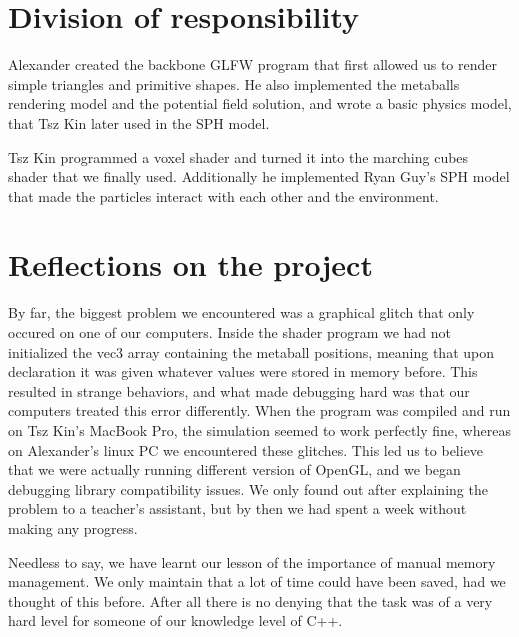 \documentclass{article}
\begin{document}
\begin{multicols}{2}
    \section{Division of responsibility}

    Alexander created the backbone GLFW program that first allowed us to render simple triangles and primitive shapes. He also implemented the metaballs rendering model and the potential field solution, and wrote a basic physics model, that Tsz Kin later used in the SPH model.

    Tsz Kin programmed a voxel shader and turned it into the marching cubes shader that we finally used. Additionally he implemented Ryan Guy's SPH model that made the particles interact with each other and the environment.

    \section{Reflections on the project}

    By far, the biggest problem we encountered was a graphical glitch that only occured on one of our computers. Inside the shader program we had not initialized the vec3 array containing the metaball positions, meaning that upon declaration it was given whatever values were stored in memory before. This resulted in strange behaviors, and what made debugging hard was that our computers treated this error differently.
    When the program was compiled and run on Tsz Kin's MacBook Pro, the simulation seemed to work perfectly fine, whereas on Alexander's linux PC we encountered these glitches. This led us to believe that we were actually running different version of OpenGL, and we began debugging library compatibility issues. We only found out after explaining the problem to a teacher's assistant, but by then we had spent a week without making any progress.

    Needless to say, we have learnt our lesson of the importance of manual memory management.
    We only maintain that a lot of time could have been saved, had we thought of this before.
    After all there is no denying that the task was of a very hard level for someone of our knowledge level of C++. 


\end{multicols}
\end{document}

